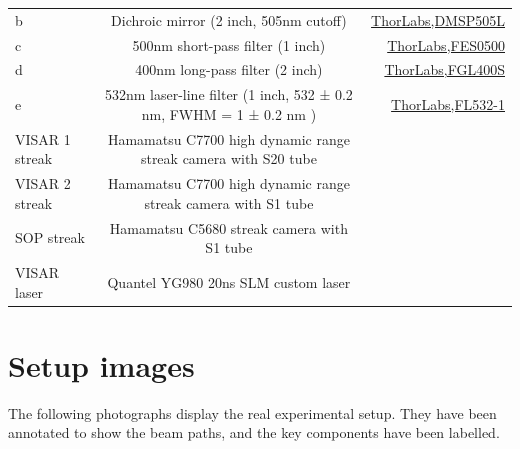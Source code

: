 \begin{landscape}
\begin{table} [ht]
\begin{tabular}{lcr}
\hline
b & Dichroic mirror (2 inch, 505nm cutoff) & \href{https://www.thorlabs.com/thorproduct.cfm?partnumber=DMSP505L}{ThorLabs,DMSP505L}\\
c & 500nm short-pass filter (1 inch) & \href{https://www.thorlabs.com/thorproduct.cfm?partnumber=FES0500}{ThorLabs,FES0500}\\
d & 400nm long-pass filter (2 inch) & \href{https://www.thorlabs.com/thorproduct.cfm?partnumber=FGL400S}{ThorLabs,FGL400S}\\
e & 532nm laser-line filter (1 inch, 532 ± 0.2 nm, FWHM = 1 ± 0.2 nm ) & \href{https://www.thorlabs.com/thorproduct.cfm?partnumber=FL532-1}{ThorLabs,FL532-1}\\
\hline
VISAR 1 streak & Hamamatsu C7700 high dynamic range streak camera with S20 tube &\\
VISAR 2 streak & Hamamatsu C7700 high dynamic range streak camera with S1 tube &\\
SOP streak & Hamamatsu C5680 streak camera with S1 tube & \\
VISAR laser & Quantel YG980 20ns SLM custom laser & \\
\hline\hline
\end{tabular}
\end{table}
\end{landscape}

\section{Setup images}

The following photographs display the real experimental setup. They have been annotated to show the beam paths, and the key components have been labelled.

